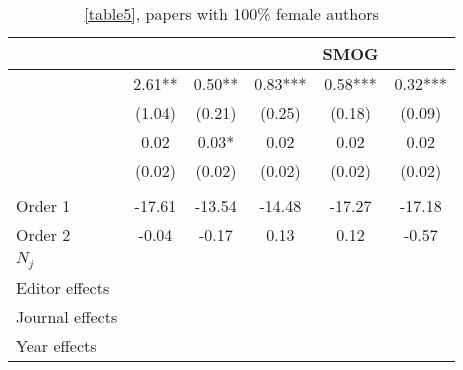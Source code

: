 \begin{table}[H]
    \footnotesize
    \centering
    \begin{threeparttable}
        \caption{\autoref{table5}, papers with 100\% female authors}
        \label{tableC5c}
        \begin{tabular}{p{4cm}S@{}S@{}S@{}S@{}S@{}}
            \toprule
            &{}&{}&{}&{SMOG}&{}\\
            \midrule
            &        2.61** &        0.50** &        0.83***&        0.58***&        0.32***\\
                                          &      (1.04)   &      (0.21)   &      (0.25)   &      (0.18)   &      (0.09)   \\
                  &        0.02   &        0.03*  &        0.02   &        0.02   &        0.02   \\
                                          &      (0.02)   &      (0.02)   &      (0.02)   &      (0.02)   &      (0.02)   \\
             \\
            Order 1&      -17.61   &      -13.54   &      -14.48   &      -17.27   &      -17.18   \\
            Order 2                       &       -0.04   &       -0.17   &        0.13   &        0.12   &       -0.57   \\
            \midrule
            \(N_j\)              &           {}   &           {}   &           {}   &           {}   &           {}   \\
            Editor effects                &           {}   &           {}   &           {}   &           {}   &           {}   \\
            Journal effects               &           {}   &           {}   &           {}   &           {}   &           {}   \\
            Year effects                  &           {}   &           {}   &           {}   &           {}   &           {}   \\

\end{tabular}
\end{threeparttable}
\end{table}

